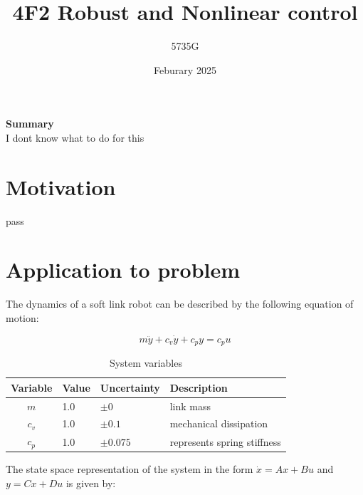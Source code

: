 \documentclass{article}
\begin{document}
\immediate{}

\title{4F2 Robust and Nonlinear control}
\author{5735G}
\date{Feburary 2025}
\maketitle 

\begin{center}
    \textbf{Summary} \\
    I dont know what to do for this
\end{center}

\section{Motivation}
pass


\section{Application to problem}

The dynamics of a soft link robot can be described by the following equation of motion:

\begin{equation}
    m\ddot{y} + c_v \dot{y} + c_p y = c_p u
\end{equation}

\begin{table}[h]
    \centering
    \begin{tabular}{c|ll|l}
        Variable & Value & Uncertainty & Description \\
        \hline
        $m$ & 1.0 & $\pm0$ & link mass \\
        $c_v$ & 1.0 & $\pm 0.1$ & mechanical dissipation \\
        $c_p$ & 1.0 & $\pm 0.075$ & represents spring stiffness \\
    \end{tabular}
    \caption{System variables}
    \label{tab:example}
\end{table}

The state space representation of the system in the form $\dot{x} = Ax + Bu$ and $y = Cx + Du$ is given by:
\end{document}
